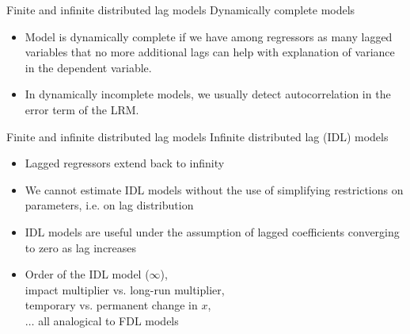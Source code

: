 \documentclass{beamer}
\begin{document}

\begin{frame}{Finite and infinite distributed lag models}
Dynamically complete models
\vspace{0.5cm}
\begin{itemize}
\item Model is dynamically complete if we have among regressors as many lagged variables that no more additional lags can help with explanation of variance in the dependent variable. 
\vspace{0.5cm}
\item In dynamically incomplete models, we usually detect autocorrelation in the error term of the LRM.
\end{itemize}
\end{frame}


\begin{frame}{Finite and infinite distributed lag models}
Infinite distributed lag (IDL) models
\begin{itemize}
\item Lagged regressors extend back to infinity
\item We cannot estimate IDL models without the use of simplifying restrictions on parameters, i.e. on lag distribution
\item IDL models are useful under the assumption of lagged coefficients converging to zero as lag increases
\item Order of the IDL model ($\infty$), 
\\impact multiplier vs. long-run multiplier, 
\\temporary vs. permanent change in $x$,
\\ $\dots$ all analogical to FDL models
\end{itemize}
\end{frame}

\end{document}
